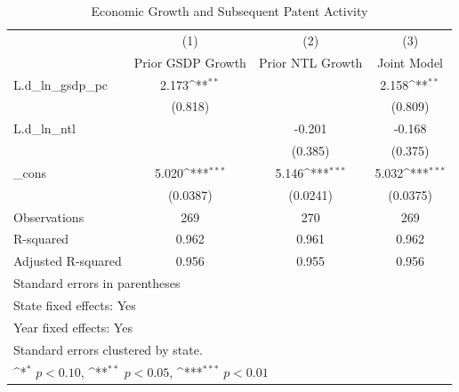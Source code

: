 \begin{table}[htbp]\centering
\def\sym#1{\ifmmode^{#1}\else\(^{#1}\)\fi}
\caption{Economic Growth and Subsequent Patent Activity}
\begin{tabular}{l*{3}{c}}
\hline\hline
            &\multicolumn{1}{c}{(1)}&\multicolumn{1}{c}{(2)}&\multicolumn{1}{c}{(3)}\\
            &\multicolumn{1}{c}{Prior GSDP Growth}&\multicolumn{1}{c}{Prior NTL Growth}&\multicolumn{1}{c}{Joint Model}\\
\hline
L.d\_ln\_gsdp\_pc&       2.173\sym{**} &                     &       2.158\sym{**} \\
            &     (0.818)         &                     &     (0.809)         \\
[1em]
L.d\_ln\_ntl  &                     &      -0.201         &      -0.168         \\
            &                     &     (0.385)         &     (0.375)         \\
[1em]
\_cons      &       5.020\sym{***}&       5.146\sym{***}&       5.032\sym{***}\\
            &    (0.0387)         &    (0.0241)         &    (0.0375)         \\
\hline
Observations&         269         &         270         &         269         \\
R-squared   &       0.962         &       0.961         &       0.962         \\
Adjusted R-squared&       0.956         &       0.955         &       0.956         \\
\hline\hline
\multicolumn{4}{l}{\footnotesize Standard errors in parentheses}\\
\multicolumn{4}{l}{\footnotesize State fixed effects: Yes}\\
\multicolumn{4}{l}{\footnotesize Year fixed effects: Yes}\\
\multicolumn{4}{l}{\footnotesize Standard errors clustered by state.}\\
\multicolumn{4}{l}{\footnotesize \sym{*} \(p<0.10\), \sym{**} \(p<0.05\), \sym{***} \(p<0.01\)}\\
\end{tabular}
\end{table}

